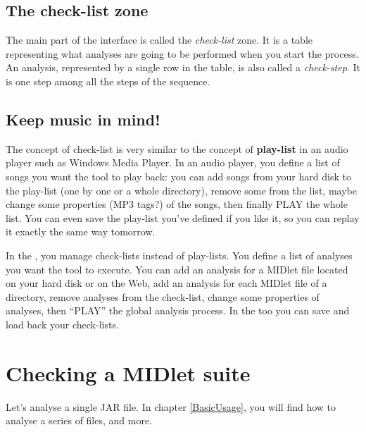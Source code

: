  \subsection*{The check-list zone}
 The main part of the interface is called the \emph{check-list} zone. It is a table
 representing what analyses are going to be performed when you start
 the process. An analysis, represented by a single row in the
 table, is also called a \emph{check-step}. It is one step among all the steps
 of the sequence.
 \subsection*{Keep music in mind!} 
 The concept of check-list is very similar to the concept of \textbf{play-list}
 in an audio player such as Windows Media Player\texttrademark. In an
 audio player, you define a list of songs you want the tool to
 play back: you can add songs from your hard disk to the play-list (one
 by one or a whole directory), remove some from the list, maybe change
 some properties (MP3 tags?) of the songs, then finally PLAY the whole
 list. You can even save the play-list you've defined if you like it,
 so you can replay it exactly the same way tomorrow.  

 In the \ma, you manage check-lists instead of play-lists. You define
 a list of analyses you want the tool to execute. You can add an analysis
 for a MIDlet file located on your hard disk or on the Web, add an
 analysis for each MIDlet file of a directory, remove analyses from the
 check-list, change some properties of analyses, then ``PLAY'' the global
 analysis process. In the \ma too you can save and load back your
 check-lists.


 \section{Checking a MIDlet suite}

Let's analyse a single JAR file. In chapter \ref{BasicUsage}, you will find how to analyse a series of
files, and more.


